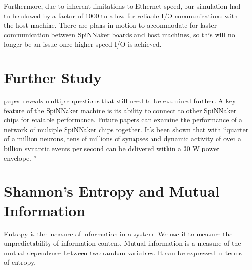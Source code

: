 \documentclass[journal]{./sty/IEEEtran}
\begin{document}
Furthermore, due to inherent limitations to Ethernet speed, our simulation had to be slowed by a factor of 1000 to allow for reliable I/O communications with the host machine. There are plans in motion to accommodate for faster communication between SpiNNaker boards and host machines, so this will no longer be an issue once higher speed I/O is achieved.

\section{Further Study}
 paper reveals multiple questions that still need to be examined further. 
A key feature of the SpiNNaker machine is its ability to connect to other SpiNNaker chips for scalable performance.
Future papers can examine the performance of a network of multiple SpiNNaker chips together.
It's been shown that with ``quarter of a million neurons, 
tens of millions of synapses and dynamic activity of over a billion synaptic events per second can be delivered within a 30 W power envelope. \cite{power:Strom}''




%


\appendices
\section{Shannon's Entropy and Mutual Information}
Entropy is the measure of information in a system. 
We use it to measure the unpredictability of information content.
Mutual information is a measure of the mutual dependence between two random variables.
It can be expressed in terms of entropy.
\end{document}
